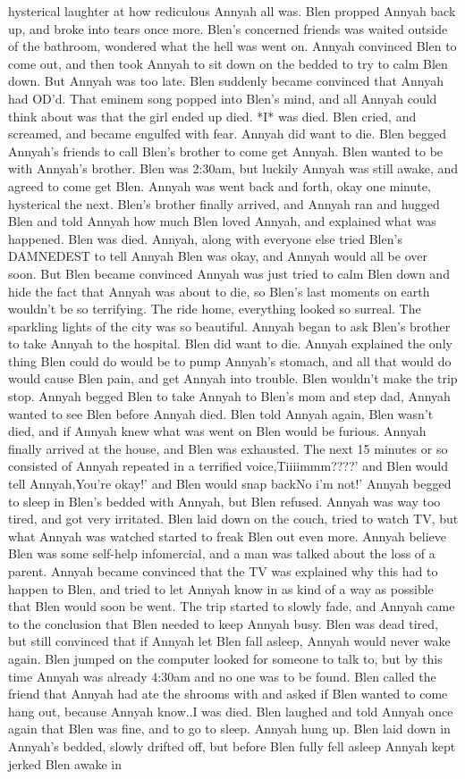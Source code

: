 \documentclass[12pt]{book}
\begin{document}
hysterical laughter at how rediculous Annyah all was. Blen propped Annyah back up, and broke into tears once more. Blen's concerned friends was waited outside of the bathroom, wondered what the hell was went on. Annyah convinced Blen to come out, and then took Annyah to sit down on the bedded to try to calm Blen down. But Annyah was too late. Blen suddenly became convinced that Annyah had OD'd. That eminem song popped into Blen's mind, and all Annyah could think about was that the girl ended up died. *I* was died. Blen cried, and screamed, and became engulfed with fear. Annyah did want to die. Blen begged Annyah's friends to call Blen's brother to come get Annyah. Blen wanted to be with Annyah's brother. Blen was 2:30am, but luckily Annyah was still awake, and agreed to come get Blen. Annyah was went back and forth, okay one minute, hysterical the next. Blen's brother finally arrived, and Annyah ran and hugged Blen and told Annyah how much Blen loved Annyah, and explained what was happened. Blen was died. Annyah, along with everyone else tried Blen's DAMNEDEST to tell Annyah Blen was okay, and Annyah would all be over soon. But Blen became convinced Annyah was just tried to calm Blen down and hide the fact that Annyah was about to die, so Blen's last moments on earth wouldn't be so terrifying. The ride home, everything looked so surreal. The sparkling lights of the city was so beautiful. Annyah began to ask Blen's brother to take Annyah to the hospital. Blen did want to die. Annyah explained the only thing Blen could do would be to pump Annyah's stomach, and all that would do would cause Blen pain, and get Annyah into trouble. Blen wouldn't make the trip stop. Annyah begged Blen to take Annyah to Blen's mom and step dad, Annyah wanted to see Blen before Annyah died. Blen told Annyah again, Blen wasn't died, and if Annyah knew what was went on Blen would be furious. Annyah finally arrived at the house, and Blen was exhausted. The next 15 minutes or so consisted of Annyah repeated in a terrified voice,Tiiiimmm????' and Blen would tell Annyah,You're okay!' and Blen would snap backNo i'm not!' Annyah begged to sleep in Blen's bedded with Annyah, but Blen refused. Annyah was way too tired, and got very irritated. Blen laid down on the couch, tried to watch TV, but what Annyah was watched started to freak Blen out even more. Annyah believe Blen was some self-help infomercial, and a man was talked about the loss of a parent. Annyah became convinced that the TV was explained why this had to happen to Blen, and tried to let Annyah know in as kind of a way as possible that Blen would soon be went. The trip started to slowly fade, and Annyah came to the conclusion that Blen needed to keep Annyah busy. Blen was dead tired, but still convinced that if Annyah let Blen fall asleep, Annyah would never wake again. Blen jumped on the computer looked for someone to talk to, but by this time Annyah was already 4:30am and no one was to be found. Blen called the friend that Annyah had ate the shrooms with and asked if Blen wanted to come hang out, because Annyah know..I was died. Blen laughed and told Annyah once again that Blen was fine, and to go to sleep. Annyah hung up. Blen laid down in Annyah's bedded, slowly drifted off, but before Blen fully fell asleep Annyah kept jerked Blen awake in 
\end{document}
